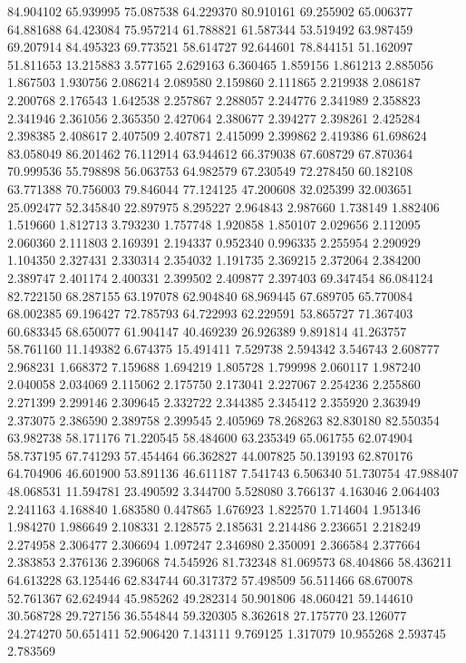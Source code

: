 84.904102
65.939995
75.087538
64.229370
80.910161
69.255902
65.006377
64.881688
64.423084
75.957214
61.788821
61.587344
53.519492
63.987459
69.207914
84.495323
69.773521
58.614727
92.644601
78.844151
51.162097
51.811653
13.215883
3.577165
2.629163
6.360465
1.859156
1.861213
2.885056
1.867503
1.930756
2.086214
2.089580
2.159860
2.111865
2.219938
2.086187
2.200768
2.176543
1.642538
2.257867
2.288057
2.244776
2.341989
2.358823
2.341946
2.361056
2.365350
2.427064
2.380677
2.394277
2.398261
2.425284
2.398385
2.408617
2.407509
2.407871
2.415099
2.399862
2.419386
61.698624
83.058049
86.201462
76.112914
63.944612
66.379038
67.608729
67.870364
70.999536
55.798898
56.063753
64.982579
67.230549
72.278450
60.182108
63.771388
70.756003
79.846044
77.124125
47.200608
32.025399
32.003651
25.092477
52.345840
22.897975
8.295227
2.964843
2.987660
1.738149
1.882406
1.519660
1.812713
3.793230
1.757748
1.920858
1.850107
2.029656
2.112095
2.060360
2.111803
2.169391
2.194337
0.952340
0.996335
2.255954
2.290929
1.104350
2.327431
2.330314
2.354032
1.191735
2.369215
2.372064
2.384200
2.389747
2.401174
2.400331
2.399502
2.409877
2.397403
69.347454
86.084124
82.722150
68.287155
63.197078
62.904840
68.969445
67.689705
65.770084
68.002385
69.196427
72.785793
64.722993
62.229591
53.865727
71.367403
60.683345
68.650077
61.904147
40.469239
26.926389
9.891814
41.263757
58.761160
11.149382
6.674375
15.491411
7.529738
2.594342
3.546743
2.608777
2.968231
1.668372
7.159688
1.694219
1.805728
1.799998
2.060117
1.987240
2.040058
2.034069
2.115062
2.175750
2.173041
2.227067
2.254236
2.255860
2.271399
2.299146
2.309645
2.332722
2.344385
2.345412
2.355920
2.363949
2.373075
2.386590
2.389758
2.399545
2.405969
78.268263
82.830180
82.550354
63.982738
58.171176
71.220545
58.484600
63.235349
65.061755
62.074904
58.737195
67.741293
57.454464
66.362827
44.007825
50.139193
62.870176
64.704906
46.601900
53.891136
46.611187
7.541743
6.506340
51.730754
47.988407
48.068531
11.594781
23.490592
3.344700
5.528080
3.766137
4.163046
2.064403
2.241163
4.168840
1.683580
0.447865
1.676923
1.822570
1.714604
1.951346
1.984270
1.986649
2.108331
2.128575
2.185631
2.214486
2.236651
2.218249
2.274958
2.306477
2.306694
1.097247
2.346980
2.350091
2.366584
2.377664
2.383853
2.376136
2.396068
74.545926
81.732348
81.069573
68.404866
58.436211
64.613228
63.125446
62.834744
60.317372
57.498509
56.511466
68.670078
52.761367
62.624944
45.985262
49.282314
50.901806
48.060421
59.144610
30.568728
29.727156
36.554844
59.320305
8.362618
27.175770
23.126077
24.274270
50.651411
52.906420
7.143111
9.769125
1.317079
10.955268
2.593745
2.783569
